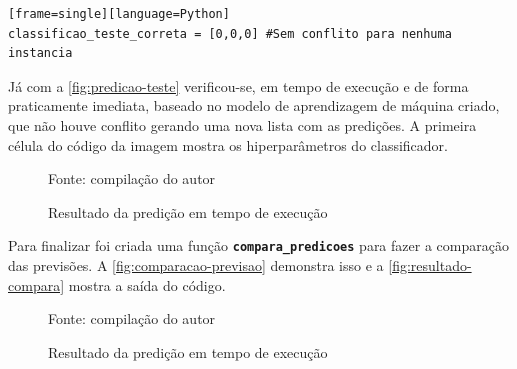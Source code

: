 \begin{lstlisting}[caption={Listas classificações corretas},label=lst-classifica-certo][frame=single][language=Python]
classificao_teste_correta = [0,0,0] #Sem conflito para nenhuma instancia
\end{lstlisting}

Já com a \autoref{fig:predicao-teste} verificou-se, em tempo de execução e de forma praticamente imediata, baseado no modelo de aprendizagem de máquina criado, que não houve conflito gerando uma nova lista com as predições. A primeira célula do código da imagem mostra os hiperparâmetros do classificador.

\begin{figure}[H]
	\centering
	\caption{Resultado da predição em tempo de execução}
	
	\label{fig:predicao-teste}
	{\scriptsize Fonte: compilação do autor}
\end{figure}

Para finalizar foi criada uma função \texttt{\textbf{compara\_predicoes}} para fazer a comparação das previsões. A \autoref{fig:comparacao-previsao} demonstra isso e a \autoref{fig:resultado-compara} mostra a saída do código.

\begin{figure}[H]
	\centering
	\caption{Resultado da predição em tempo de execução}
	
	\label{fig:comparacao-previsao}
	{\scriptsize Fonte: compilação do autor}
\end{figure}


